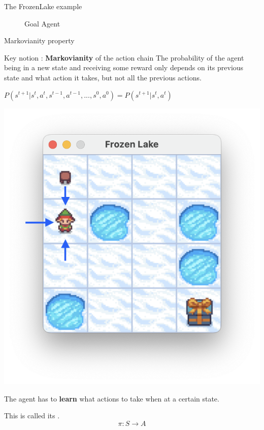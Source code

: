 \documentclass[aspectratio=169,xcolor=dvipsnames]{beamer}
\begin{document}
\begin{frame}{The FrozenLake example}
\begin{figure}[h!]
\begin{minipage}{0.45\textwidth}
        \caption{Goal Agent}
    \end{minipage}
\end{figure}

\end{frame}


\begin{frame}{Markovianity property}

\begin{block}{Key notion : \textbf{Markovianity} of the action chain}
The probability of the agent being in a new state and receiving some reward only depends on its previous state and what action it takes, but not all the previous actions.
\vspace{10pt}

\centering
$P(s^{t+1} | s^t, a^t, s^{t-1}, a^{t-1}, ..., s^0, a^0) = P(s^{t+1} | s^t, a^t)$

\end{block}
\begin{center}
    \begin{minipage}{0.4\textwidth} 
        \includegraphics[scale=0.4]{images/previous-move.png}
    \end{minipage}
    \begin{minipage}{0.55\textwidth}
        The agent has to \textbf{learn} what actions to take when at a certain state.
        
        \vspace{10pt}
        This is called its .
        \vspace{10pt}
         \[
\pi: S \rightarrow A
\]
   
    \end{minipage}
\end{center}
\end{frame}
\end{document}
